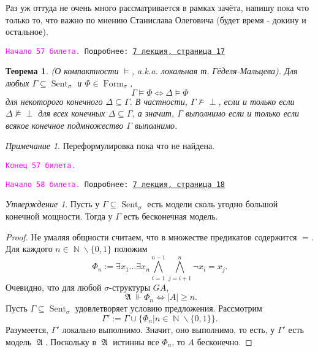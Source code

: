 \documentclass[a4paper,100pt]{article}
\theoremstyle{indented}
\newtheorem{theorem}{Теорема}
\theoremstyle{definition}
\theoremstyle{remark}
\newtheorem{remark}{Примечание}
\newtheorem{stat}{Утверждение}
\DeclareMathOperator{\Llra}{\Longleftrightarrow}
\DeclareMathOperator{\NN}{\mathbb{N}}
\DeclareMathOperator{\form}{Form}
\DeclareMathOperator{\Sent}{Sent}
\DeclareMathOperator{\GA}{\mathfrak{A}}
\begin{document}
Раз уж оттуда не очень много рассматривается в рамках зачёта, напишу пока что только то, что важно по мнению Станислава Олеговича (будет время - докину и остальное). 

\hrulefill

\texttt{\hypertarget{b57}{\textcolor{magenta}{Начало 57 билета.}} Подробнее: \href{http://www.mi-ras.ru/~speranski/courses/logic-1-2021-spring/slides_7.pdf}{7 лекция, страница 17}} \\

\begin{theorem}
  (О компактности $\vDash$, a.k.a. локальная т. Гёделя-Мальцева). Для любых $\Gamma \subseteq \Sent_\sigma$ и $\Phi \in \form_\sigma$, 
  \[
    \Gamma \vDash \Phi \Llra \Delta \vDash \Phi
  \]
  для некоторого конечного $\Delta \subseteq \Gamma$. В частности, $\Gamma \nvDash \perp$, если и только если $\Delta \nvDash \perp$ для всех конечных $\Delta \subseteq \Gamma$, а значит, $\Gamma$ выполнимо если и только если всякое конечное подмножество $\Gamma$ выполнимо.
\end{theorem}

\begin{remark}
  Переформулировка пока что не найдена.
\end{remark}

\texttt{\textcolor{magenta}{Конец 57 билета.}} 

\hrulefill

\texttt{\hypertarget{b58}{\textcolor{magenta}{Начало 58 билета.}} Подробнее: \href{http://www.mi-ras.ru/~speranski/courses/logic-1-2021-spring/slides_7.pdf}{7 лекция, страница 18}} 

\begin{stat}
  Пусть у $\Gamma \subseteq \Sent_\sigma$ есть модели сколь угодно большой конечной мощности. Тогда у $\Gamma$ есть бесконечная модель.
\end{stat}

\begin{proof}
  Не умаляя общности считаем, что в множестве предикатов содержится $=$. Для каждого $n \in \NN \backslash \{0, 1\}$ положим 
  \[
    \Phi_n := \exists x_1 \ldots \exists x_n \bigwedge_{i=1}^{n-1}\bigwedge_{j=i+1}^n \neg x_i = x_j.
  \]
  Очевидно, что для любой $\sigma$-структуры $GA$, 
  \[
    \GA \Vdash \Phi_n \Longleftrightarrow |A|\geq n.
  \]
  Пусть $\Gamma \subseteq \Sent_\sigma$ удовлетворяет условию предложения. Рассмотрим 
  \[
    \Gamma' := \Gamma \cup \{\Phi_n | n\in \NN \backslash \{0, 1\}\}.
  \]
  Разумеется, $\Gamma'$ локально выполнимо. Значит, оно выполнимо, то есть, у $\Gamma'$ есть модель $\GA$. Поскольку в $\GA$ истинны все $\Phi_n$, то $A$ бесконечно.
\end{proof}
\end{document}
